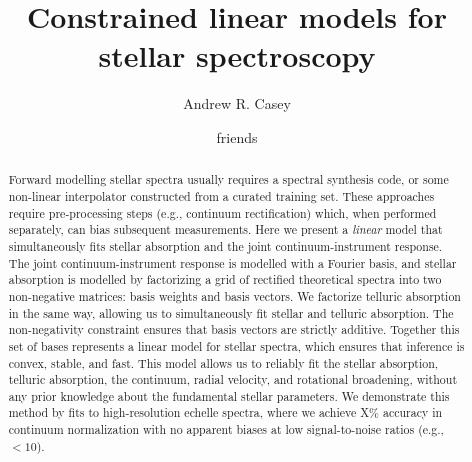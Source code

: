 \documentclass[modern]{aastex631}
\newcommand{\chosentitle}{Constrained linear models for stellar spectroscopy}
\newcommand{\todo}[1]{\textcolor{tab:red}{#1}}
\begin{document}
\title{\chosentitle}

\author[0000-0003-0174-0564]{Andrew R. Casey}

\author{friends}



\begin{abstract}\noindent
Forward modelling stellar spectra usually requires a spectral synthesis code, or some non-linear interpolator constructed from a curated training set. 
These approaches require pre-processing steps (e.g., continuum rectification) which, when performed separately, can bias subsequent measurements.
Here we present a \emph{linear} model that simultaneously fits stellar absorption and the joint continuum-instrument response.
The joint continuum-instrument response is modelled with a Fourier basis, and stellar absorption is modelled by factorizing a grid of rectified theoretical spectra into two non-negative matrices: basis weights and basis vectors. 
We factorize telluric absorption in the same way, allowing us to simultaneously fit stellar and telluric absorption.
The non-negativity constraint ensures that basis vectors are strictly additive.
Together this set of bases represents a linear model for stellar spectra, which ensures that inference is convex, stable, and fast.
This model allows us to reliably fit the stellar absorption, telluric absorption, the continuum, radial velocity, and rotational broadening, without any prior knowledge about the fundamental stellar parameters.
We demonstrate this method by fits to high-resolution echelle spectra, where we achieve \todo{X\%} accuracy in continuum normalization with no apparent biases at low signal-to-noise ratios (e.g., $<10$).
\end{abstract}

\end{document}
